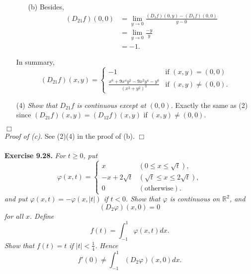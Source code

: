 \documentclass{article}
\begin{document}
\begin{enumerate}
\begin{enumerate}
  \item[(b)]
    Besides,
    \begin{align*}
      (D_{21} f)(0,0)
      &= \lim_{y \to 0} \frac{(D_1 f)(0,y) - (D_1 f)(0,0)}{y - 0} \\
      &= \lim_{y \to 0} \frac{-y}{y} \\
      &= -1.
    \end{align*}
  \end{enumerate}
  In summary,
  \begin{equation*}
    (D_{21} f)(x,y) =
    \begin{cases}
      -1
        & \text{if $(x,y) = (0,0)$} \\
      \frac{x^6+9x^4y^2-9x^2y^4-y^6}{(x^2+y^2)^3}
        & \text{if $(x,y) \neq (0,0)$}.
    \end{cases}
  \end{equation*}

\item[(4)]
  \emph{Show that $D_{21}f$ is continuous except at $(0,0)$.}
  Exactly the same as (2) since $(D_{21} f)(x,y) = (D_{12} f)(x,y)$ if $(x,y) \neq (0,0)$.

\end{enumerate}
$\Box$ \\



\emph{Proof of (c).}
  See (2)(4) in the proof of (b).
$\Box$ \\\\






\textbf{Exercise 9.28.}
\emph{For $t \geq 0$, put
\begin{equation*}
  \varphi(x,t) =
    \begin{cases}
      x
        & (0 \leq x \leq \sqrt{t}), \\
      -x + 2\sqrt{t}
        & (\sqrt{t} \leq x \leq 2\sqrt{t}), \\
      0
        & (\text{otherwise}).
    \end{cases}
\end{equation*}
and put $\varphi(x,t) = -\varphi(x,|t|)$ if $t < 0$.
Show that $\varphi$ is continuous on $\mathbb{R}^2$, and
\[
  (D_2 \varphi)(x,0) = 0
\]
for all $x$.
Define
\[
  f(t) = \int_{-1}^{1} \varphi(x,t)dx.
\]
Show that $f(t) = t$ if $|t| < \frac{1}{4}$.
Hence}
\[
  f'(0) \neq \int_{-1}^{1} (D_2 \varphi)(x,0) dx.
\]
\end{document}
